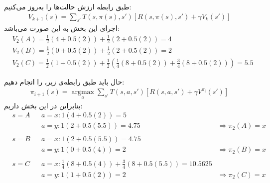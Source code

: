 \question{}

\begin{ابجد}
\item طبق رابطه  ارزش حالت‌ها را به‌روز می‌کنیم:
\begin{align*}
    V_{k+1}(s) = \sum_{s'}T(s, \pi(s), s')[R(s, \pi(s), s') + \gamma V_k(s')]
\end{align*}
اجرای این بخش به این صورت می‌باشد:
\begin{align*}
     & V_2(A) = \frac{1}{2}(4 + 0.5(2)) + \frac{1}{2}(2 + 0.5(2)) = 4                                          \\
     & V_2(B) = \frac{1}{2}(0 + 0.5(2)) + \frac{1}{2}(2 + 0.5(2)) = 2                                          \\
     & V_2(C) = \frac{1}{2}(1 + 0.5(2)) + \frac{1}{2}(\frac{1}{4}(8 + 0.5(2)) + \frac{3}{4}(8 + 0.5(2))) = 5.5
\end{align*}

\item حال باید طبق رابطه‌ی زیر،  را انجام دهیم:
\begin{align*}
    \pi_{i + 1}(s) = \operatorname*{argmax}_a \sum_{s'}T(s, a, s')[R(s, a, s') + \gamma V^{\pi_i}(s')]
\end{align*}
بنابراین در این بخش داریم:
\begin{align*}
     & s=A &  & a=x: 1(4 + 0.5(2)) = 5                                                                        \\
     &     &  & a=y: 1(2 + 0.5(5.5)) = 4.75                                        & \Rightarrow \pi_2(A) = x \\
    \\
     & s=B &  & a=x: 1(2 + 0.5(5.5)) = 4.75                                                                   \\
     &     &  & a=y: 1(0 + 0.5(4)) = 2                                             & \Rightarrow \pi_2(B) = x \\
    \\
     & s=C &  & a=x: \frac{1}{4}(8 + 0.5(4)) + \frac{3}{4}(8 + 0.5(5.5)) = 10.5625                            \\
     &     &  & a=y: 1(1 + 0.5(2)) = 2                                             & \Rightarrow \pi_2(C) = x \\
\end{align*}


\end{ابجد}
